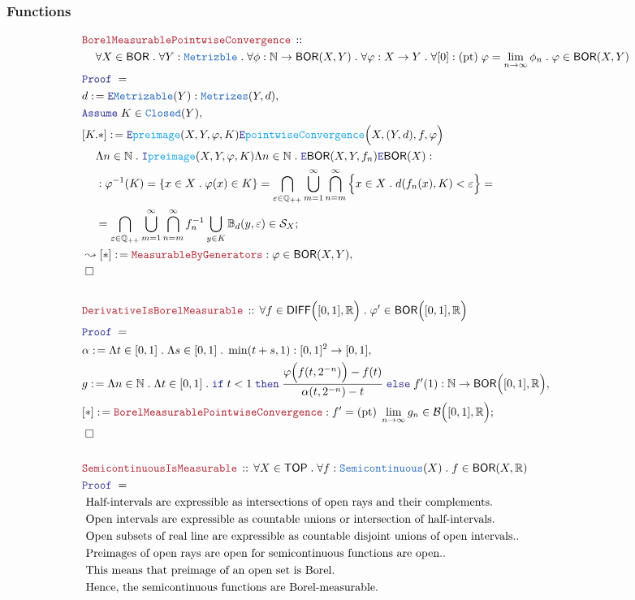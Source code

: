 \documentclass[12pt]{scrartcl}
\newcommand{\TYPE}[1]{\textcolor{NavyBlue}{\mathtt{#1}}}
\newcommand{\FUNC}[1]{\textcolor{Cerulean}{\mathtt{#1}}}
\newcommand{\LOGIC}[1]{\textcolor{Blue}{\mathtt{#1}}}
\newcommand{\THM}[1]{\textcolor{Maroon}{\mathtt{#1}}}
\renewcommand{\.}{\; . \;}
\newcommand{\de}{: \kern 0.1pc =}
\newcommand{\If}{\LOGIC{if} \;}
\newcommand{\Then}{ \; \LOGIC{then} \;}
\newcommand{\Else}{\; \LOGIC{else} \;}
\newcommand{\Theorem}[2]{& \THM{#1} \, :: \, #2 \\ & \Proof = \\ }
\newcommand{\NewLine}{\\ & \kern 1pc}
\newcommand{\Page}[1]{ \begin{align*} #1 \end{align*}   }
\newcommand{\Intro}{\LOGIC{I}}
\newcommand{\Elim}{\LOGIC{E}}
\newcommand{\Reals}{\mathbb{R} }
\newcommand{\Rats}{\mathbb{Q} }
\newcommand{\Nat}{\mathbb{N} }
\newcommand{\Say}[3]{& #1 \de #2 : #3, \\}
\newcommand{\Conclude}[3]{& #1 \de #2 : #3; \\}
\newcommand{\Derive}[3]{& \leadsto #1 \de #2 : #3, \\}
\newcommand{\AssumeIn}[2]{& \LOGIC{Assume} \; #1 \in #2, \\}
\newcommand{\QED}{\; \square}
\newcommand{\EndProof}{& \QED \\}
\newcommand{\Proof}{\LOGIC{Proof} \; }
\newcommand{\Explain}[1]{& \text{#1.} \\}
\newcommand{\B}{\mathcal{B}}
\newcommand{\Closed}{\TYPE{Closed}}
\newcommand{\TOP}{\mathsf{TOP}}
\newcommand{\BOR}{\mathsf{BOR}}
\renewcommand{\S}{\mathcal{S}}
\begin{document}
\subsubsection{Functions}
\Page{
	\Theorem{BorelMeasurablePointwiseConvergence}
	{
		\NewLine		
		\forall X \in \BOR \.
		\forall Y : \TYPE{Metrizble} \.
		\forall \phi : \Nat \to \BOR(X,Y) \.
		\forall \varphi : X \to Y \.
		\forall [0] : (\mathrm{pt})\;\varphi = \lim_{n \to \infty} \phi_n \.
		\varphi \in \BOR(X,Y)
	}
	\Say{d}{\Elim \TYPE{Metrizable}(Y)}
	{
		\TYPE{Metrizes}(Y,d)
	}	
	\AssumeIn{K}{\Closed(Y)}
	\Conclude{[K.*]}{
		\Elim \FUNC{preimage}(X,Y,\varphi,K)
		\Elim \FUNC{pointwiseConvergence}\Big(X,(Y,d),f,\varphi\Big) \NewLine
		\Lambda n \in \Nat \. \Intro \FUNC{preimage}(X,Y,\varphi,K)	
		\Lambda n \in \Nat \.  \Elim \BOR(X,Y,f_n)
		\Elim \BOR(X)
	}
	{
		\NewLine :		
		\varphi^{-1}(K) =
		\{   x \in X \. \varphi(x) \in K \}  =
		\bigcap_{\varepsilon \in \Rats_{++}}
		\bigcup_{m=1}^\infty \bigcap_{n=m}^\infty
		\Big\{   x \in X \. d(f_n(x),K) < \varepsilon \Big\} = \NewLine =
		\bigcap_{\varepsilon \in \Rats_{++}}\bigcup_{m=1}^\infty \bigcap_{n=m}^\infty
		f^{-1}_n \bigcup_{y \in K} \mathbb{B}_d(y,\varepsilon) \in \S_X
	}
	\Derive{[*]}{\THM{MeasurableByGenerators}}{
		\varphi \in \BOR(X,Y)	
	}
	\EndProof
	\\
	\Theorem{DerivativeIsBorelMeasurable}
	{
		\forall f \in \mathsf{DIFF}\Big([0,1],\Reals\Big) \.
		\varphi' \in \BOR\Big([0,1],\Reals\Big)
	}
	\Say{\alpha}{ \Lambda t \in [0,1] \. \Lambda s \in [0,1] \. \min(t+s,1)   }
	{
		[0,1]^2 \to [0,1]
	}
	\Say{g}
	{
		\Lambda n \in \Nat \.
		\Lambda t \in [0,1] \.
		\If  t < 1
		\Then
		\frac{\varphi\Big(f(t,2^{-n})\Big) - f(t)}
		{
			\alpha(t,2^{-n}) - t
		}
		\Else
		f'(1)
	}
	{
		\Nat \to \BOR\Big( [0,1], \Reals \Big)
	}
	\Conclude{[*]}{\THM{BorelMeasurablePointwiseConvergence}}
	{
		f' = (\mathrm{pt}) \; \lim_{n \to \infty} g_n \in \B\Big([0,1],\Reals\Big)
	}
	\EndProof
	\\
	\Theorem{SemicontinuousIsMeasurable}
	{
		\forall X \in \TOP \.
		\forall f : \TYPE{Semicontinuous}(X) \.
		f \in \BOR(X,\Reals)
	}
	\Explain{ Half-intervals are expressible as intersections of open rays and their complements}
	\Explain{ Open intervals are expressible as countable unions or intersection of half-intervals}
	\Explain{ Open subsets of real line are expressible as countable disjoint unions of open intervals.}
	\Explain{ Preimages of open rays are open for semicontinuous functions are open.}
	\Explain{ This means that preimage of an open set is Borel}
	\Explain{ Hence, the semicontinuous functions are Borel-measurable}
}
\end{document}

